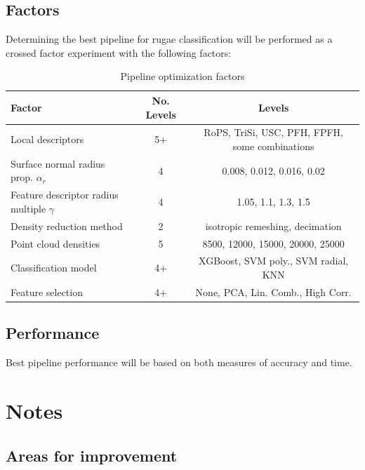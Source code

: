 \documentclass[11pt]{article}
\theoremstyle{definition}
\begin{document}
\subsection{Factors}

Determining the best pipeline for rugae classification will be performed as a crossed factor experiment with the following factors:

\begin{table}[ht]
    \centering
    \caption{Pipeline optimization factors}
    \label{tab:pipeFacts}
    \begin{tabular}{l|c|c}
        \toprule
        \textbf{Factor} & \textbf{No. Levels} & \textbf{Levels} \\
        \midrule
        Local descriptors & 5+ & RoPS, TriSi, USC, PFH, FPFH, some combinations \\
        Surface normal radius prop. $\alpha_r$ & 4 & 0.008, 0.012, 0.016, 0.02 \\
        Feature descriptor radius multiple $\gamma$ & 4 & 1.05, 1.1, 1.3, 1.5 \\
        Density reduction method & 2 & isotropic remeshing, decimation \\
        Point cloud densities & 5 & 8500, 12000, 15000, 20000, 25000 \\
        Classification model & 4+ & XGBoost, SVM poly., SVM radial, KNN\\
        Feature selection & 4+ & None, PCA, Lin. Comb., High Corr. \\
        \bottomrule
    \end{tabular}
\end{table}

\subsection{Performance}

Best pipeline performance will be based on both measures of accuracy and time.

\newpage

\section{Notes}

\subsection{Areas for improvement}
\end{document}
